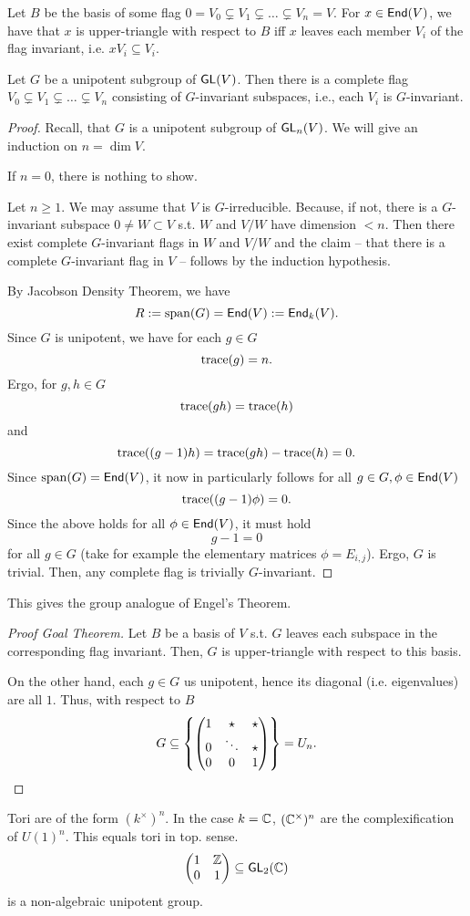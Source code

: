 Let $B$ be the basis of some flag $0 = V_0 \subsetneq V_1 \subsetneq \ldots \subsetneq V_n = V$.
For $x \in \textsf{End}(V)$, we have that $x$ is upper-triangle with respect to $B$ iff $x$ leaves each member $V_i$ of the flag invariant, i.e. $xV_i \subseteq V_i.$

\begin{proposition}
	Let $G$ be a unipotent subgroup of $\textsf{GL}(V)$. Then there is a complete flag $ V_0 \subsetneq V_1 \subsetneq \ldots \subsetneq V_n$ consisting of $G$-invariant subspaces, i.e., each $V_i$ is $G$-invariant.
\end{proposition}
\begin{proof}
Recall, that $G$ is a unipotent subgroup of $\textsf{GL}_n(V)$. We will give an induction on $n = \dim V$.

If $n = 0$, there is nothing to show.

Let $n \geq 1$. We may assume that $V$ is $G$-irreducible. Because, if not, there is a $G$-invariant subspace $0\neq W \subset V$ s.t. $W$ and $V/W$ have dimension $< n$. Then there exist complete $G$-invariant flags in $W$ and $V/W$ and the claim -- that there is a complete $G$-invariant flag in $V$ -- follows by the induction hypothesis.

By Jacobson Density Theorem, we have
\[ R := \mathrm{span}(G) = \textsf{End}(V) := \textsf{End}_k(V). \]
Since $G$ is unipotent, we have for each $g \in G$
\[ \mathrm{trace}(g) = n.\]
Ergo, for $g,h \in G$
\[ \mathrm{trace}(gh) = \mathrm{trace}(h) \]
and
\[ \mathrm{trace}((g-1)h) = \mathrm{trace}(gh) - \mathrm{trace}(h) = 0. \]
Since $\mathrm{span}(G) = \textsf{End}(V)$, it now in particularly follows for all $g \in G, \phi \in \textsf{End}(V)$
\[ \mathrm{trace}((g-1) \phi) = 0. \]
Since the above holds for all $\phi \in \textsf{End}(V)$, it must hold
\[ g-1 = 0 \]
for all $g \in G$ (take for example the elementary matrices $\phi = E_{i,j}$). Ergo, $G$ is trivial. Then, any complete flag is trivially $G$-invariant.
\end{proof}
\begin{remark}
	This gives the group analogue of Engel's Theorem.
\end{remark}
\begin{proof}[Proof Goal Theorem]
	Let $B$ be a basis of $V$ s.t. $G$ leaves each subspace in the corresponding flag invariant. Then, $G$ is upper-triangle with respect to this basis.
	
	On the other hand, each $g \in G$ us unipotent, hence its diagonal (i.e. eigenvalues) are all $1$. Thus, with respect to $B$
	\[ G \subseteq \left\lbrace
	\left(\begin{matrix} 1 & \star & \star\\ 0 & \ddots & \star \\ 0 & 0 & 1 \end{matrix}\right)\right\rbrace = U_n.\]
\end{proof}
\begin{remark}
	Tori are of the form $(k^\times)^n$. In the case $k = \mathbb{C}$, $(\mathbb{C}^\times)^n$ are the complexification of $U(1)^n$. This equals tori in top. sense.
	\[
	\left(\begin{matrix} 1 & \mathbb{Z} \\ 0 & 1 \end{matrix}\right) \subseteq \textsf{GL}_2(\mathbb{C})
	 \]
	 is a non-algebraic unipotent group.
\end{remark}
